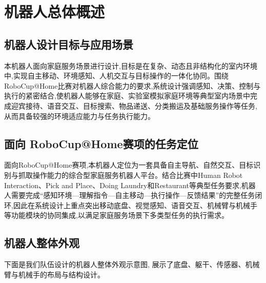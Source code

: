 \documentclass[12pt,hyperref,a4paper,UTF8]{ctexart}
\begin{document}
\cover

%
%

\thispagestyle{empty} %

\newpage
\tableofcontents

\newpage


\section{机器人总体概述}
\subsection{机器人设计目标与应用场景}
本机器人面向家庭服务场景进行设计,目标是在复杂、动态且非结构化的室内环境中,实现自主移动、环境感知、人机交互与目标操作的一体化协同。围绕RoboCup@Home比赛对机器人综合能力的要求,系统设计强调感知、决策、控制与执行的紧密结合,使机器人能够在家庭、实验室模拟家庭环境等典型室内场景中完成迎宾接待、语音交互、目标搜索、物品递送、分类搬运及基础服务操作等任务,从而具备较强的环境适应能力与任务执行能力。
\subsection{面向 RoboCup@Home赛项的任务定位}
面向RoboCup@Home赛项,本机器人定位为一套具备自主导航、自然交互、目标识别与抓取操作能力的综合型家庭服务机器人平台。结合比赛中Human Robot Interaction、Pick and Place、Doing Laundry和Restaurant等典型任务要求,机器人需要完成“感知环境—理解指令—自主移动—执行操作—反馈结果”的完整任务闭环,因此在系统设计上重点突出移动底盘、视觉感知、语音交互、机械臂与机械手等功能模块的协同集成,以满足家庭服务场景下多类型任务的执行需求。

\subsection{机器人整体外观}
下面是我们队伍设计的机器人整体外观示意图,
展示了底盘、躯干、传感器、机械臂与机械手的布局与结构设计。
\end{document}
